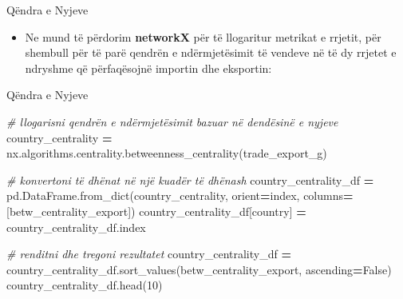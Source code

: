 \documentclass[
  ignorenonframetext,
]{beamer}
\newenvironment{Shaded}{\begin{snugshade}}{\end{snugshade}}
\newcommand{\CommentTok}[1]{\textcolor[rgb]{0.56,0.35,0.01}{\textit{#1}}}
\newcommand{\DecValTok}[1]{\textcolor[rgb]{0.00,0.00,0.81}{#1}}
\newcommand{\NormalTok}[1]{#1}
\newcommand{\OperatorTok}[1]{\textcolor[rgb]{0.81,0.36,0.00}{\textbf{#1}}}
\newcommand{\StringTok}[1]{\textcolor[rgb]{0.31,0.60,0.02}{#1}}
\newcommand{\VariableTok}[1]{\textcolor[rgb]{0.00,0.00,0.00}{#1}}
\providecommand{\tightlist}{%
  \setlength{\itemsep}{0pt}\setlength{\parskip}{0pt}}
\begin{document}
\begin{frame}{Qëndra e Nyjeve}
\protect\hypertarget{quxebndra-e-nyjeve}{}
\begin{itemize}
\tightlist
\item
  Ne mund të përdorim \textbf{networkX} për të llogaritur metrikat e
  rrjetit, për shembull për të parë qendrën e ndërmjetësimit të vendeve
  në të dy rrjetet e ndryshme që përfaqësojnë importin dhe eksportin:
\end{itemize}
\end{frame}

\begin{frame}[fragile]{Qëndra e Nyjeve}
\protect\hypertarget{quxebndra-e-nyjeve-1}{}

\begin{Shaded}
\begin{Highlighting}[]
\CommentTok{\# llogarisni qendrën e ndërmjetësimit bazuar në dendësinë e nyjeve}
\NormalTok{country\_centrality }\OperatorTok{=}\NormalTok{ nx.algorithms.centrality.betweenness\_centrality(trade\_export\_g)}

\CommentTok{\# konvertoni të dhënat në një kuadër të dhënash}
\NormalTok{country\_centrality\_df }\OperatorTok{=}\NormalTok{ pd.DataFrame.from\_dict(country\_centrality, }
\NormalTok{                                orient}\OperatorTok{=}\StringTok{\textquotesingle{}index\textquotesingle{}}\NormalTok{, columns}\OperatorTok{=}\NormalTok{[}\StringTok{\textquotesingle{}betw\_centrality\_export\textquotesingle{}}\NormalTok{])}
\NormalTok{country\_centrality\_df[}\StringTok{\textquotesingle{}country\textquotesingle{}}\NormalTok{] }\OperatorTok{=}\NormalTok{ country\_centrality\_df.index}

\CommentTok{\# renditni dhe tregoni rezultatet}
\NormalTok{country\_centrality\_df }\OperatorTok{=}\NormalTok{ country\_centrality\_df.sort\_values(}\StringTok{\textquotesingle{}betw\_centrality\_export\textquotesingle{}}\NormalTok{, ascending}\OperatorTok{=}\VariableTok{False}\NormalTok{)}
\NormalTok{country\_centrality\_df.head(}\DecValTok{10}\NormalTok{)}
\end{Highlighting}
\end{Shaded}
\end{frame}
\end{document}
